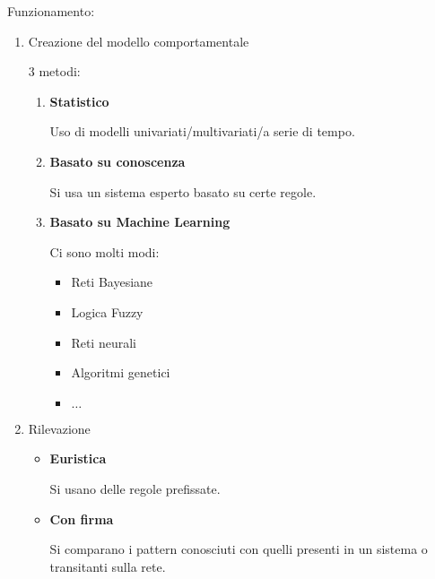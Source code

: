 \documentclass{article}
\begin{document}
\noindent Funzionamento:
\begin{enumerate}
    \item Creazione del modello comportamentale

        3 metodi:
            \begin{enumerate}
                \item \textbf{Statistico}

                    Uso di modelli univariati/multivariati/a serie di tempo.
                
                \item \textbf{Basato su conoscenza}

                    Si usa un sistema esperto basato su certe regole.
                
                \item \textbf{Basato su Machine Learning}

                    Ci sono molti modi:
                        \begin{itemize}
                            \item Reti Bayesiane
                            \item Logica Fuzzy
                            \item Reti neurali
                            \item Algoritmi genetici
                            \item $\ldots$
                        \end{itemize}
                
            \end{enumerate}
    
    \item Rilevazione
        \begin{itemize}
            \item \textbf{Euristica}

                Si usano delle regole prefissate.
            
            \item \textbf{Con firma}

                Si comparano i pattern conosciuti con quelli presenti in un sistema o transitanti sulla rete.\newline
            
        \end{itemize}
    
\end{enumerate}
\end{document}
